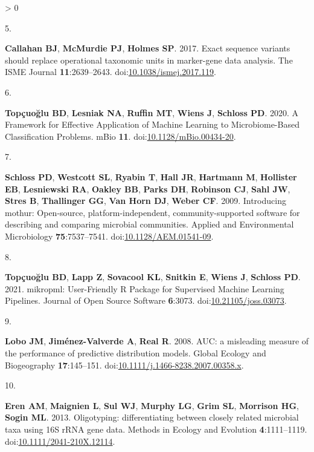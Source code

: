 \documentclass[
]{article}
\newlength{\cslhangindent}
\newlength{\csllabelwidth}
\newenvironment{CSLReferences}[2] %
 {%
  \setlength{\parindent}{0pt}
  \ifodd #1 \everypar{\setlength{\hangindent}{\cslhangindent}}\ignorespaces\fi
  \ifnum #2 > 0
  \setlength{\parskip}{#2\baselineskip}
  \fi
 }%
 {}
\newcommand{\CSLLeftMargin}[1]{\parbox[t]{\csllabelwidth}{#1}}
\newcommand{\CSLRightInline}[1]{\parbox[t]{\linewidth - \csllabelwidth}{#1}\break}
\begin{document}
\begin{CSLReferences}{0}{0}
\leavevmode\hypertarget{ref-callahan2017}{}%
\CSLLeftMargin{5. }
\CSLRightInline{\textbf{Callahan BJ}, \textbf{McMurdie PJ},
\textbf{Holmes SP}. 2017. Exact sequence variants should replace
operational taxonomic units in marker-gene data analysis. The ISME
Journal \textbf{11}:2639--2643.
doi:\href{https://doi.org/10.1038/ismej.2017.119}{10.1038/ismej.2017.119}.}

\leavevmode\hypertarget{ref-topuxe7uolu2020}{}%
\CSLLeftMargin{6. }
\CSLRightInline{\textbf{Topçuoğlu BD}, \textbf{Lesniak NA},
\textbf{Ruffin MT}, \textbf{Wiens J}, \textbf{Schloss PD}. 2020. A
Framework for Effective Application of Machine Learning to
Microbiome-Based Classification Problems. mBio \textbf{11}.
doi:\href{https://doi.org/10.1128/mBio.00434-20}{10.1128/mBio.00434-20}.}

\leavevmode\hypertarget{ref-schloss2009}{}%
\CSLLeftMargin{7. }
\CSLRightInline{\textbf{Schloss PD}, \textbf{Westcott SL},
\textbf{Ryabin T}, \textbf{Hall JR}, \textbf{Hartmann M},
\textbf{Hollister EB}, \textbf{Lesniewski RA}, \textbf{Oakley BB},
\textbf{Parks DH}, \textbf{Robinson CJ}, \textbf{Sahl JW}, \textbf{Stres
B}, \textbf{Thallinger GG}, \textbf{Van Horn DJ}, \textbf{Weber CF}.
2009. Introducing mothur: Open-source, platform-independent,
community-supported software for describing and comparing microbial
communities. Applied and Environmental Microbiology
\textbf{75}:7537--7541.
doi:\href{https://doi.org/10.1128/AEM.01541-09}{10.1128/AEM.01541-09}.}

\leavevmode\hypertarget{ref-topuxe7uolu2021}{}%
\CSLLeftMargin{8. }
\CSLRightInline{\textbf{Topçuoğlu BD}, \textbf{Lapp Z}, \textbf{Sovacool
KL}, \textbf{Snitkin E}, \textbf{Wiens J}, \textbf{Schloss PD}. 2021.
mikropml: User-Friendly R Package for Supervised Machine Learning
Pipelines. Journal of Open Source Software \textbf{6}:3073.
doi:\href{https://doi.org/10.21105/joss.03073}{10.21105/joss.03073}.}

\leavevmode\hypertarget{ref-lobo2008}{}%
\CSLLeftMargin{9. }
\CSLRightInline{\textbf{Lobo JM}, \textbf{Jiménez-Valverde A},
\textbf{Real R}. 2008. AUC: a misleading measure of the performance of
predictive distribution models. Global Ecology and Biogeography
\textbf{17}:145--151.
doi:\href{https://doi.org/10.1111/j.1466-8238.2007.00358.x}{10.1111/j.1466-8238.2007.00358.x}.}

\leavevmode\hypertarget{ref-eren2013}{}%
\CSLLeftMargin{10. }
\CSLRightInline{\textbf{Eren AM}, \textbf{Maignien L}, \textbf{Sul WJ},
\textbf{Murphy LG}, \textbf{Grim SL}, \textbf{Morrison HG},
\textbf{Sogin ML}. 2013. Oligotyping: differentiating between closely
related microbial taxa using 16S rRNA gene data. Methods in Ecology and
Evolution \textbf{4}:1111--1119.
doi:\href{https://doi.org/10.1111/2041-210X.12114}{10.1111/2041-210X.12114}.}


\end{CSLReferences}
\end{document}
